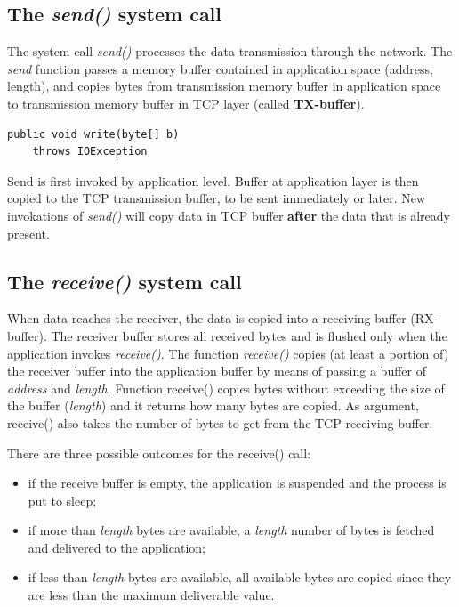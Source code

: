 \documentclass[a4paper, 11pt]{report}
\begin{document}
\subsection{The \emph{send()} system call}

The system call \emph{send()} processes the data transmission through the
network. The \emph{send} function passes a memory buffer contained in
application space (address, length), and copies bytes from transmission memory
buffer in application space to transmission memory buffer in TCP layer (called
\textbf{TX-buffer}).

\begin{lstlisting}
public void write(byte[] b)
	throws IOException
\end{lstlisting}

Send is first invoked by application level. Buffer at application layer is then
copied to the TCP transmission buffer, to be sent immediately or later. New
invokations of \emph{send()} will copy data in TCP buffer \textbf{after} the
data that is already present. 

\subsection{The \emph{receive()} system call}

When data reaches the receiver, the data is copied into a receiving buffer
(RX-buffer). The receiver buffer stores all received bytes and is flushed only
when the application invokes \emph{receive()}. The function
\emph{receive()} copies (at least a portion of) the receiver buffer into the
application buffer by means of passing a buffer of \emph{address} and
\emph{length}. Function receive() copies bytes without exceeding the size of
the buffer (\emph{length}) and it returns how many bytes are copied. As
argument, receive() also takes the number of bytes to get from the TCP
receiving buffer.

There are three possible outcomes for the receive() call:

\begin{itemize}
	\item if the receive buffer is empty, the application is suspended and
		the process is put to sleep;
	\item if more than \emph{length} bytes are available, a
        \emph{length} number of bytes is fetched and delivered to the
        application;
	\item if less than \emph{length} bytes are available, all available
        bytes are copied since they are less than the maximum deliverable
        value.
\end{itemize}
\end{document}
